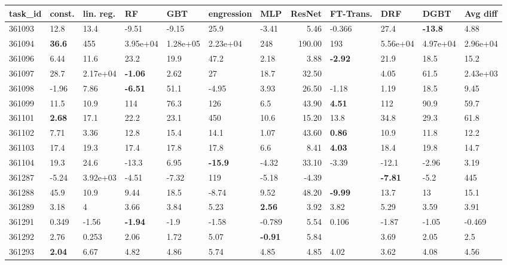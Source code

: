\begin{table}[ht!]
\centering
\begingroup\footnotesize
\begin{tabular}{lllllllrllll}
  \hline
\hline
task\_id & const. & lin. reg. & RF & GBT & engression & MLP & ResNet & FT-Trans. & DRF & DGBT & Avg diff \\ 
  \hline
361093 & 12.8 & 13.4 & -9.51 & -9.15 & 25.9 & -3.41 & 5.46 & -0.366 & 27.4 & \textbf{-13.8} & 4.88 \\ 
  361094 & \textbf{36.6} & 455 & 3.95e+04 & 1.28e+05 & 2.23e+04 & 248 & 190.00 & 193 & 5.56e+04 & 4.97e+04 & 2.96e+04 \\ 
  361096 & 6.44 & 11.6 & 23.2 & 19.9 & 47.2 & 2.18 & 3.88 & \textbf{-2.92} & 21.9 & 18.5 & 15.2 \\ 
  361097 & 28.7 & 2.17e+04 & \textbf{-1.06} & 2.62 & 27 & 18.7 & 32.50 &  & 4.05 & 61.5 & 2.43e+03 \\ 
  361098 & -1.96 & 7.86 & \textbf{-6.51} & 51.1 & -4.95 & 3.93 & 26.50 & -1.18 & 1.19 & 18.5 & 9.45 \\ 
  361099 & 11.5 & 10.9 & 114 & 76.3 & 126 & 6.5 & 43.90 & \textbf{4.51} & 112 & 90.9 & 59.7 \\ 
  361101 & \textbf{2.68} & 17.1 & 22.2 & 23.1 & 450 & 10.6 & 15.20 & 13.8 & 34.8 & 29.3 & 61.8 \\ 
  361102 & 7.71 & 3.36 & 12.8 & 15.4 & 14.1 & 1.07 & 43.60 & \textbf{0.86} & 10.9 & 11.8 & 12.2 \\ 
  361103 & 17.4 & 19.3 & 17.4 & 17.8 & 17.8 & 6.6 & 8.41 & \textbf{4.03} & 18.4 & 19.8 & 14.7 \\ 
  361104 & 19.3 & 24.6 & -13.3 & 6.95 & \textbf{-15.9} & -4.32 & 33.10 & -3.39 & -12.1 & -2.96 & 3.19 \\ 
  361287 & -5.24 & 3.92e+03 & -4.51 & -7.32 & 119 & -5.18 & -4.39 &  & \textbf{-7.81} & -5.2 & 445 \\ 
  361288 & 45.9 & 10.9 & 9.44 & 18.5 & -8.74 & 9.52 & 48.20 & \textbf{-9.99} & 13.7 & 13 & 15.1 \\ 
  361289 & 3.18 & 4 & 3.66 & 3.84 & 5.23 & \textbf{2.56} & 3.92 & 3.82 & 5.29 & 3.59 & 3.91 \\ 
  361291 & 0.349 & -1.56 & \textbf{-1.94} & -1.9 & -1.58 & -0.789 & 5.54 & 0.106 & -1.87 & -1.05 & -0.469 \\ 
  361292 & 2.76 & 0.253 & 2.06 & 1.72 & 5.07 & \textbf{-0.91} & 5.84 &  & 3.69 & 2.05 & 2.5 \\ 
  361293 & \textbf{2.04} & 6.67 & 4.82 & 4.86 & 5.74 & 4.85 & 4.85 & 4.02 & 3.62 & 4.08 & 4.56 \\ 

\end{tabular}
\end{table}
